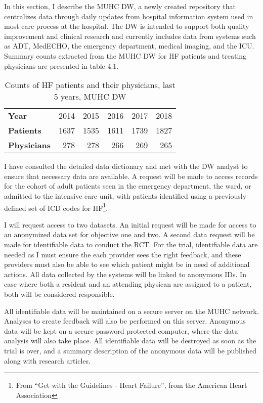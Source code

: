 In this section, I describe the MUHC \gls{DW}, a newly created repository that centralizes data through daily updates from hospital information system used in most care process at the hospital. The \gls{DW} is intended to support both quality improvement and clinical research and currently includes data from systems such as ADT, MedECHO, the emergency department, medical imaging, and the ICU. Summary counts extracted from the MUHC DW for HF patients and treating physicians are presented in table 4.1.

\begin{table}[h!]
\centering
\begin{tabular}{l|rrrrr}
\textbf{Year}       & 2014 & 2015 & 2016 & 2017 & 2018   \\
\textbf{Patients}   & 1637 & 1535 & 1611 & 1739 & 1827 \\
\textbf{Physicians} & 278 & 278 & 266 & 269 & 265 
\end{tabular}
\caption{Counts of HF patients and their physicians, last 5 years, MUHC DW}
\end{table}

I have consulted the detailed data dictionary and met with the DW analyst to ensure that necessary data are available. A request will be made to access records for the cohort of adult patients seen in the emergency department, the ward, or admitted to the intensive care unit, with patients identified using a previously defined set of ICD codes for HF\footnote{From ``Get with the Guidelines - Heart Failure'', from the American Heart Association}.

I will request access to two datasets. An initial request will be made for access to an anonymized data set for objective one and two. A second data request will be made for identifiable data to conduct the RCT. For the trial, identifiable data are needed as I must ensure the each provider sees the right feedback, and these providers must also be able to see which patient might be in need of additional actions. All data collected by the systems will be linked to anonymous IDs. In case where both a resident and an attending physican are assigned to a patient, both will be considered responsible.

All identifiable data will be maintained on a secure server on the MUHC network. Analyses to create feedback will also be performed on this server. Anonymous data will be kept on a secure password protected computer, where the data analysis will also take place. All identifiable data will be destroyed as soon as the trial is over, and a summary description of the anonymous data will be published along with research articles.

